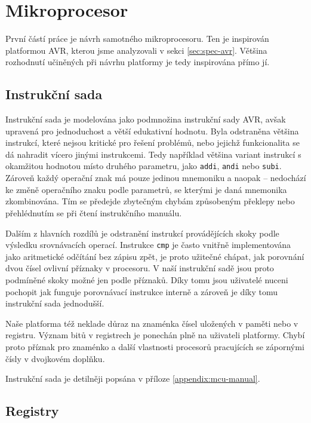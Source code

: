 \chapter{Mikroprocesor}

První částí práce je návrh samotného mikroprocesoru. Ten je inspirován platformou AVR, kterou jsme analyzovali v sekci \ref{sec:spec-avr}. Většina rozhodnutí učiněných při návrhu platformy je tedy inspirována přímo jí.

\section{Instrukční sada}

Instrukční sada je modelována jako podmnožina instrukční sady AVR, avšak upravená pro jednoduchost a větší edukativní hodnotu. Byla odstraněna většina instrukcí, které nejsou kritické pro řešení problémů, nebo jejichž funkcionalita se dá nahradit vícero jinými instrukcemi. Tedy například většina variant instrukcí s okamžitou hodnotou místo druhého parametru, jako \texttt{addi}, \texttt{andi} nebo \texttt{subi}. Zároveň každý operační znak má pouze jedinou mnemoniku a naopak -- nedochází ke změně operačního znaku podle parametrů, se kterými je daná mnemonika zkombinována. Tím se předejde zbytečným chybám způsobeným překlepy nebo přehlédnutím se při čtení instrukčního manuálu.

Dalším z hlavních rozdílů je odstranění instrukcí provádějících skoky podle výsledku srovnávacích operací. Instrukce \texttt{cmp} je často vnitřně implementována jako aritmetické odčítání bez zápisu zpět, je proto užitečné chápat, jak porovnání dvou čísel ovlivní příznaky v procesoru. V naší instrukční sadě jsou proto podmíněné skoky možné jen podle příznaků. Díky tomu jsou uživatelé nuceni pochopit jak funguje porovnávací instrukce interně a zároveň je díky tomu instrukční sada jednodušší.

Naše platforma též neklade důraz na znaménka čísel uložených v paměti nebo v registru. Význam bitů v registrech je ponechán plně na uživateli platformy. Chybí proto příznak pro znaménko a další vlastnosti procesorů pracujících se zápornými čísly v dvojkovém doplňku.


Instrukční sada je detilněji popsána v příloze \ref{appendix:mcu-manual}.

\section{Registry}

